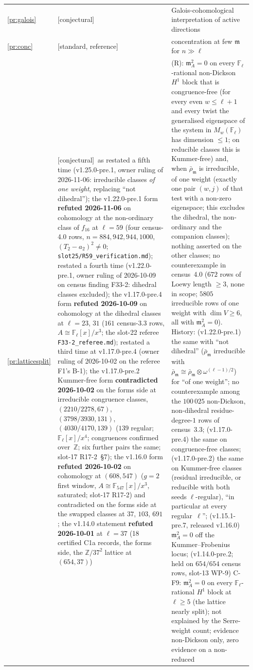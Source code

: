 \documentclass[11pt]{article}
\theoremstyle{remark}
\newcommand{\F}{\mathbb{F}}
\newcommand{\Z}{\mathbb{Z}}
\newcommand{\Fl}{\F_\ell}
\newcommand{\m}{\mathfrak{m}}
\newcommand{\STD}{\textsf{[standard, reference]}}
\newcommand{\CONJ}{\textsf{[conjectural]}}
\begin{document}
\begin{center}
\begin{longtable}{@{}l>{\raggedright\arraybackslash}p{3.6cm}>{\raggedright\arraybackslash}p{10.6cm}@{}}
\ref{pr:galois} & \CONJ & Galois-cohomological interpretation of active directions \\
\ref{pr:conc} & \STD & concentration at few $\m$ for $n\gg\ell$ \\
\ref{pr:latticesplit} & \CONJ\ as restated a fifth time (v1.25.0-pre.1, owner ruling of 2026-11-06: irreducible classes \emph{of one weight}, replacing ``not dihedral''); the v1.22.0-pre.1 form \textbf{refuted 2026-11-06} on cohomology at the non-ordinary class of $f_{16}$ at $\ell=59$ (four census-4.0 rows, $n=884,942,944,1000$, $(T_2-a_2)^2\ne0$; \texttt{slot25/R59\_verification.md}); restated a fourth time (v1.22.0-pre.1, owner ruling of 2026-10-09 on census finding F33-2: dihedral classes excluded); the v1.17.0-pre.4 form \textbf{refuted 2026-10-09} on cohomology at the dihedral classes at $\ell=23$, $31$ ($161$ census-3.3 rows, $A\cong\Fl[x]/x^3$; the slot-22 referee \texttt{F33-2\_referee.md}); restated a third time at v1.17.0-pre.4 (owner ruling of 2026-10-02 on the referee F1's B-1); the v1.17.0-pre.2 Kummer-free form \textbf{contradicted 2026-10-02} on the forms side at irreducible congruence classes, $(2210/2278,67)$, $(3798/3930,131)$, $(4030/4170,139)$ ($139$ regular; $\Fl[x]/x^4$; congruences confirmed over~$\Z$; six further pairs the same; slot-17 R17-2~\S7); the v1.16.0 form \textbf{refuted 2026-10-02} on cohomology at $(608,547)$ ($g=2$ first window, $A\cong\F_{547}[x]/x^3$, saturated; slot-17 R17-2) and contradicted on the forms side at the swapped classes at $37$, $103$, $691$; the v1.14.0 statement \textbf{refuted 2026-10-01} at $\ell=37$ (18 certified C1a records, the forms side, the $\Z/37^2$ lattice at $(654,37)$) & (R): $\m_A^2=0$ on every $\Fl$-rational non-Dickson $H^1$ block that is congruence-free (for every even $w\le\ell+1$ and every twist the generalised eigenspace of the system in $M_w(\Fl)$ has dimension $\le1$; on reducible classes this is Kummer-free) and, when $\bar\rho_\m$ is irreducible, of one weight (exactly one pair $(w,j)$ of that test with a non-zero eigenspace; this excludes the dihedral, the non-ordinary and the companion classes); nothing asserted on the other classes; no counterexample in census~4.0 ($672$ rows of Loewy length $\ge3$, none in scope; $5805$ irreducible rows of one weight with $\dim V\ge6$, all with $\m_A^2=0$). History: (v1.22.0-pre.1) the same with ``not dihedral'' ($\bar\rho_\m$ irreducible with $\bar\rho_\m\cong\bar\rho_\m\otimes\omega^{(\ell-1)/2}$) for ``of one weight''; no counterexample among the $100\,025$ non-Dickson, non-dihedral residue-degree-$1$ rows of census~3.3; (v1.17.0-pre.4) the same on congruence-free classes; (v1.17.0-pre.2) the same on Kummer-free classes (residual irreducible, or reducible with both seeds $\ell$-regular), ``in particular at every regular~$\ell$''; (v1.15.1-pre.7, released v1.16.0) $\m_A^2=0$ off the Kummer--Frobenius locus; (v1.14.0-pre.2; held on $654/654$ census rows, slot-13 WP-9) C-F9: $\m_A^2=0$ on every $\Fl$-rational $H^1$ block at $\ell\ge5$ (the lattice nearly split); not explained by the Serre-weight count; evidence non-Dickson only, zero evidence on a non-reduced 
\end{longtable}
\end{center}
\end{document}
